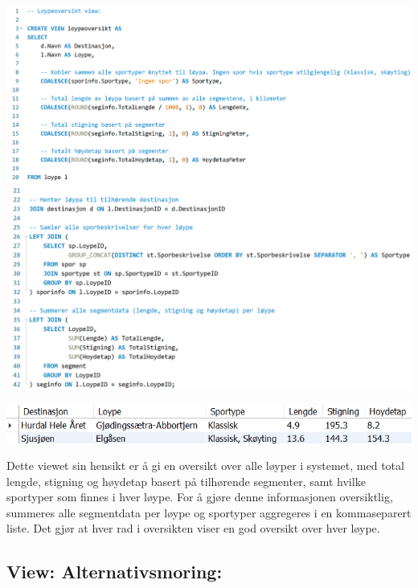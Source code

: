 \documentclass[10pt, a4paper]{article}
\begin{document}
\includegraphics[width=\textwidth]{loypeoversikt_1.png}
\includegraphics[width=\textwidth]{loypeoversikt_2.png}

\includegraphics[width=\textwidth]{loypeoversikt_resultat.png}

	Dette viewet sin hensikt er å gi en oversikt over alle løyper i systemet, med total lengde, stigning og høydetap basert på tilhørende segmenter, samt hvilke sportyper som finnes i hver løype. For å gjøre denne informasjonen oversiktlig, summeres alle segmentdata per løype og sportyper aggregeres i en kommaseparert liste. Det gjør at hver rad i oversikten viser en god oversikt over hver løype. 

\subsection{View: Alternativsmoring:}
\end{document}
